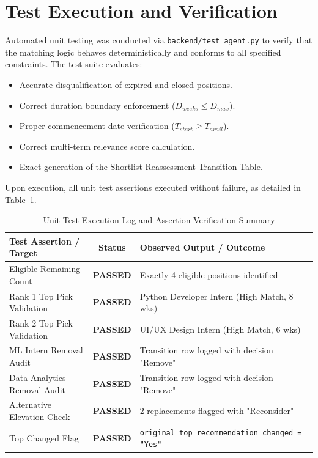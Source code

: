 \section{Test Execution and Verification} \label{S6.2}
Automated unit testing was conducted via \texttt{backend/test\_agent.py} to verify that the matching logic behaves deterministically and conforms to all specified constraints. The test suite evaluates:
\begin{itemize}
	\item Accurate disqualification of expired and closed positions.
	\item Correct duration boundary enforcement ($D_{weeks} \le D_{max}$).
	\item Proper commencement date verification ($T_{start} \ge T_{avail}$).
	\item Correct multi-term relevance score calculation.
	\item Exact generation of the Shortlist Reassessment Transition Table.
\end{itemize}

Upon execution, all unit test assertions executed without failure, as detailed in Table~\ref{t6.2}.

\begin{table}[h!]
\centering
\caption{Unit Test Execution Log and Assertion Verification Summary}
\label{t6.2}
\begin{tabular}{|l|c|l|}
\hline
\textbf{Test Assertion / Target} & \textbf{Status} & \textbf{Observed Output / Outcome} \\ \hline
Eligible Remaining Count & \textbf{PASSED} & Exactly 4 eligible positions identified \\ \hline
Rank 1 Top Pick Validation & \textbf{PASSED} & Python Developer Intern (High Match, 8 wks) \\ \hline
Rank 2 Top Pick Validation & \textbf{PASSED} & UI/UX Design Intern (High Match, 6 wks) \\ \hline
ML Intern Removal Audit & \textbf{PASSED} & Transition row logged with decision "Remove" \\ \hline
Data Analytics Removal Audit & \textbf{PASSED} & Transition row logged with decision "Remove" \\ \hline
Alternative Elevation Check & \textbf{PASSED} & 2 replacements flagged with "Reconsider" \\ \hline
Top Changed Flag & \textbf{PASSED} & \texttt{original\_top\_recommendation\_changed = "Yes"} \\ \hline
\end{tabular}
\end{table}

